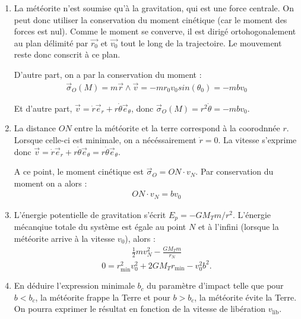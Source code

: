 \begin{correction}

\begin{enumerate}
\item La météorite n'est soumise qu'à la gravitation, qui est une force centrale. On peut donc utiliser la conservation du moment cinétique (car le moment des forces est nul). Comme le moment se converve, il est dirigé ortohogonalement au plan délimité par $\vec{r_0}$ et $\vec{v_0}$ tout le long de la trajectoire. Le mouvement reste donc conscrit à ce plan.

D'autre part, on a par la conservation du moment :
\begin{align*}
	\vec{\sigma}_O(M)=m\vec{r}\wedge\vec{v}=-mr_0v_0sin(\theta_0)=-mbv_0
\end{align*}

Et d'autre part, $\vec{v}=\dot{r}\vec{e}_r+r\dot{\theta}\vec{e}_\theta$, donc $\vec{\sigma}_O(M)=r^2\dot{\theta}=-mbv_0$.


\item La distance $ON$ entre la météorite et la terre correspond à la coorodnnée $r$. Lorsque celle-ci est minimale, on a nécéssairement $\dot{r}=0$. La vitesse s'exprime donc $\vec{v}=\dot{r}\vec{e}_r+r\dot{\theta}\vec{e}_\theta=r\dot{\theta}\vec{e}_\theta$.

A ce point, le moment cinétique est $\vec{\sigma}_O=ON\cdot v_N$. Par conservation du moment on a alors :
\begin{align*}
	ON\cdot v_N=bv_0
\end{align*}

\item L'énergie potentielle de gravitation s'écrit $E_p=-GM_Tm/r^2$. L'énergie mécanqiue totale du système est égale au point $N$ et à l'infini (lorsque la météorite arrive à la vitesse $v_0$), alors :
\begin{align*}
	\frac{1}{2}mv_N^2-\frac{GM_Tm}{r_N}
\end{align*}
$$
0=r^2_\mathrm{min}v_0^2+2GM_Tr_\mathrm{min}-v_0^2b^2.
$$
\item En déduire l'expression minimale $b_c$ du paramètre d'impact telle que pour $b<b_c$, la météorite frappe la Terre et pour $b>b_c$, la météorite évite la Terre. On pourra exprimer le résultat en fonction de la vitesse de libération $v_\mathrm{lib}$.

\end{enumerate}

\end{correction}

